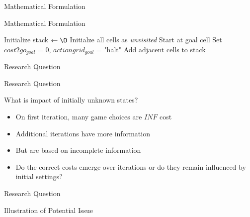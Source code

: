 \documentclass[xcolor=table, 9pt]{beamer}
\begin{document}
\begin{section}{Mathematical Formulation}
\begin{frame}{Mathematical Formulation}
\begin{algorithm}[H]
        Initialize stack $\leftarrow \O$\;
        Initialze all cells as \textit{unvisited}\;
        Start at goal cell\;
        Set $cost2go_{goal}$ = 0, $actiongrid_{goal}$ = "halt"\;
        Add adjacent cells to stack\;
        \end{algorithm}
    \end{frame}
\end{section}

\begin{section}{Research Question}
    \begin{frame}{Research Question}
        \begin{block}{What is impact of initially unknown states?}
            \begin{itemize}
                \item On first iteration, many game choices are $INF$ cost
                \item Additional iterations have more information
                \item But are based on incomplete information
                \item Do the correct costs emerge over iterations or do they remain influenced by initial settings?
            \end{itemize}
        \end{block}
    \end{frame}
    \begin{frame}{Research Question}
        \begin{block}{Illustration of Potential Issue}


\end{block}
\end{frame}
\end{section}
\end{document}
